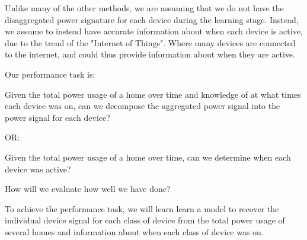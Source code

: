 \documentclass{article}
\begin{document}
Unlike many of the other methods, we are assuming that we do not have the disaggregated power signature for each device during the learning stage. Instead, we assume to instead have accurate information about when each device is active, due to the trend of the "Internet of Things". Where many devices are connected to the internet, and could thus provide information about when they are active.

Our performance task is:

Given the total power usage of a home over time and knowledge of at what times each device was on, can we decompose the aggregated power signal into the power signal for each device?

OR:

Given the total power usage of a home over time, can we determine when each device was active?

How will we evaluate how well we have done?



To achieve the performance task, we will learn learn a model to recover the individual device signal for each class of device from the total power usage of several homes and information about when each class of device was on.




\end{document}
